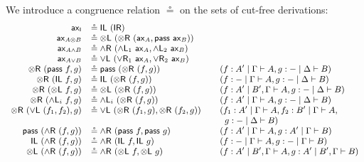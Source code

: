 \documentclass[submission,copyright,creativecommons]{eptcs}
\theoremstyle{definition}
\newcommand{\tl}{\otimes \mathsf{L}}
\newcommand{\tr}{\otimes \mathsf{R}}
\newcommand{\pass}{\mathsf{pass}}
\newcommand{\unitl}{\mathsf{IL}}
\newcommand{\unitr}{\mathsf{IR}}
\newcommand{\andlone}{\land \mathsf{L}_{1}}
\newcommand{\andltwo}{\land \mathsf{L}_{2}}
\newcommand{\andli}{\land \mathsf{L}_{i}}
\newcommand{\andr}{\land \mathsf{R}}
\newcommand{\orl}{\lor \mathsf{L}}
\newcommand{\orrone}{\lor \mathsf{R}_{1}}
\newcommand{\orrtwo}{\lor \mathsf{R}_{2}}
\newcommand{\ax}{\mathsf{ax}}
\newcommand{\ot}{\otimes}
\newcommand{\I}{\mathsf{I}}
\begin{document}
We introduce a congruence relation $\circeq$ on the sets of cut-free derivations:
  \begin{equation}\label{fig:circeq}
  \small
  \begin{array}{rlll}
    \ax_{\I} &\circeq \unitl \text{ } (\unitr)
    \\
    \ax_{A \ot B} &\circeq \tl \text{ } (\tr \text{ } (\ax_{A} , \pass \text{ } \ax_{B}))
    \\
    \ax_{A \land B} &\circeq \andr \ (\andlone \ \ax_A , \andltwo \ \ax_B)
    \\
    \ax_{A \lor B} &\circeq \orl \ (\orrone \ \ax_A , \orrtwo \ \ax_B)
    \\
    \tr \text{ } (\pass \text{ } f, g) &\circeq \pass \text{ } (\tr \text{ } (f, g)) &&(f : A' \mid \Gamma \vdash A, g : {-} \mid \Delta \vdash B)
    \\
    \tr \text{ } (\unitl \text{ } f, g) &\circeq \unitl \text{ } (\tr \text{ } (f , g)) &&(f : {-} \mid \Gamma \vdash A , g : {-} \mid \Delta \vdash B)
    \\
    \tr \text{ } (\tl \text{ } f, g) &\circeq \tl \text{ } (\tr \text{ } (f , g)) &&(f : A' \mid B' , \Gamma \vdash A , g : {-} \mid \Delta \vdash B)
    \\
    \tr \ (\andli \ f , g) &\circeq \andli \ (\tr \ (f , g)) &&(f : A' \mid \Gamma \vdash A, g : - \mid \Delta \vdash B)
    \\
    \tr \ (\orl \ (f_1 , f_2) , g) &\circeq \orl \ (\tr \ (f_1 , g) , \tr \ (f_2 , g)) &&(f_1 : A' \mid \Gamma \vdash A , f_2 : B' \mid \Gamma \vdash A , \\
    & && \;\;g : - \mid \Delta \vdash B)
    \\
    \pass \ (\andr \ (f , g)) &\circeq  \andr \ (\pass \ f , \pass \ g) &&(f : A' \mid \Gamma \vdash A , g : A' \mid \Gamma \vdash B)
    \\
    \unitl \ (\andr \ (f , g)) &\circeq  \andr \ (\unitl \ f , \unitl \ g) &&(f : - \mid \Gamma \vdash A , g : - \mid \Gamma \vdash B)
    \\
    \tl \ (\andr \ (f , g)) &\circeq  \andr \ (\tl \ f , \tl \ g) &&(f : A' \mid B' , \Gamma \vdash A , g : A' \mid B' , \Gamma \vdash B)

\end{array}
\end{equation}
\end{document}
